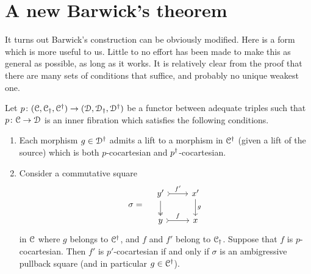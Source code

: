 \documentclass[main.tex]{subfiles}
\begin{document}
\section{A new Barwick's theorem}
\label{sec:a_new_barwick_s_theorem}

It turns out Barwick's construction can be obviously modified. Here is a form which is more useful to us. Little to no effort has been made to make this as general as possible, as long as it works. It is relatively clear from the proof that there are many sets of conditions that suffice, and probably no unique weakest one.

\begin{theorem}
  \label{thm:old_barwick}
  Let $p\colon (\mathcal{C}, \mathcal{C}_{\dagger}, \mathcal{C}^{\dagger}) \to (\mathcal{D}, \mathcal{D}_{\dagger}, \mathcal{D}^{\dagger})$ be a functor between adequate triples such that $p\colon \mathcal{C} \to \mathcal{D}$ is an inner fibration which satisfies the following conditions.
  \begin{enumerate}
    \item Each morphism $g \in \mathcal{D}^{\dagger}$ admits a lift to a morphism in $\mathcal{C}^{\dagger}$ (given a lift of the source) which is both $p$-cocartesian and $p^{\dagger}$-cocartesian.

    \item Consider a commutative square
      \begin{equation*}
        \sigma = \quad
        \begin{tikzcd}
          y'
          \arrow[r, rightarrowtail, "f'"]
          \arrow[d, two heads, swap]
          & x'
          \arrow[d, "g"]
          \\
          y
          \arrow[r, rightarrowtail, "f"]
          & x
        \end{tikzcd}
      \end{equation*}
      in $\mathcal{C}$ where $g$ belongs to $\mathcal{C}^{\dagger}$, and $f$ and $f'$ belong to $\mathcal{C}_{\dagger}$. Suppose that $f$ is $p$-cocartesian. Then $f'$ is $p'$-cocartesian if and only if $\sigma$ is an ambigressive pullback square (and in particular $g \in \mathcal{C}^{\dagger}$).
  \end{enumerate}
\end{theorem}
\end{document}
